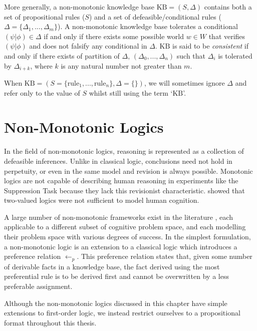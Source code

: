 More generally, a non-monotonic knowledge base $\text{KB}=(S, \Delta)$ contains both a set of propositional rules ($S$) and a set of defeasible/conditional rules ($\Delta=\{\Delta_1,...,\Delta_m\}$). A non-monotonic knowledge base tolerates a conditional $(\psi|\phi)\in\Delta$ if and only if there exists some possible world $w\in W$ that verifies $(\psi|\phi)$ and does not falsify any conditional in $\Delta$. $\text{KB}$ is said to be \textit{consistent} if and only if there exists of partition of $\Delta$, $(\Delta_0,...,\Delta_n)$ such that $\Delta_i$ is tolerated by $\Delta_{i+k}$, where $k$ is any natural number not greater than $m$. 

When $\text{KB}=(S=\{\textrm{rule}_1,...,\textrm{rule}_n\},\Delta=\{\})$, we will sometimes ignore $\Delta$ and refer only to the value of $S$ whilst still using the term `$\text{KB}$'.
%




\section{Non-Monotonic Logics}
In the field of non-monotonic logics, reasoning is represented as a collection of defeasible inferences. Unlike in classical logic, conclusions need not hold in perpetuity, or even in the same model and revision is always possible. Monotonic logics are not capable of describing human reasoning in experiments like the Suppression Task \citep{dietz2012computational} because they lack this revisionist characteristic. \cite{ragni2016two} showed that two-valued logics were not sufficient to model human cognition.

A large number of non-monotonic frameworks exist in the literature \citep{mcdermott1980non}, each applicable to a different subset of cognitive problem space, and each modelling their problem space with various degrees of success. In the simplest formulation, a non-monotonic logic is an extension to a classical logic which introduces a preference relation $\leftarrow_p$. This preference relation states that, given some number of derivable facts in a knowledge base, the fact derived using the most preferential rule is to be derived first and cannot be overwritten by a less preferable assignment.  

Although the non-monotonic logics discussed in this chapter have simple extensions to first-order logic, we instead restrict ourselves to a propositional format throughout this thesis.

